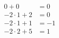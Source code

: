 \documentclass[preview]{standalone}
\begin{document}
\begin{align*}
0 + 0 & = 0\\ - 2\cdot1 + 2 & = 0 \\ - 2\cdot1 + 1 & = -1 \\ - 2\cdot2 + 5 & = 1
\end{align*}
\end{document}
